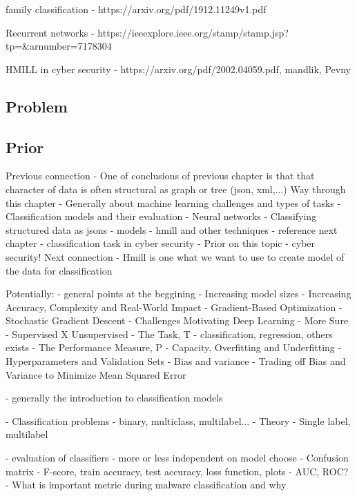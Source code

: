 family classification - https://arxiv.org/pdf/1912.11249v1.pdf

Recurrent networks - https://ieeexplore.ieee.org/stamp/stamp.jsp?tp=&arnumber=7178304

HMILL in cyber security - https://arxiv.org/pdf/2002.04059.pdf, mandlik, Pevny

\subsection{Problem}
\subsection{Prior}






Previous connection
- One of conclusions of previous chapter is that that character of data is often structural as graph or tree (json, xml,...)
Way through this chapter
- Generally about machine learning challenges and types of tasks
- Classification models and their evaluation
- Neural networks
- Classifying structured data as jsons - models
    - hmill and other techniques - reference next chapter
- classification task in cyber security
- Prior on this topic - cyber security!
Next connection
- Hmill is one what we want to use to create model of the data for classification


\cite{GoodBengCour16}
Potentially:
- general points at the beggining
    - Increasing model sizes
    - Increasing Accuracy, Complexity and Real-World Impact
    - Gradient-Based Optimization
    - Stochastic Gradient Descent
    - Challenges Motivating Deep Learning
- More Sure
    - Supervised X Unsupervised
    - The Task, T - classification, regression, others exists
    - The Performance Measure, P
    - Capacity, Overfitting and Underfitting
    - Hyperparameters and Validation Sets
    - Bias and variance - Trading off Bias and Variance to Minimize Mean Squared
    Error

\cite{Bishop2006}
 - generally the introduction to classification models


- Classification problems - binary, multiclass, multilabel...
- Theory
- Single label, multilabel

- evaluation of classifiers - more or less independent on model choose
  - Confusion matrix
  - F-score, train accuracy, test accuracy, loss function, plots
        - AUC, ROC?
  - What is important metric during malware classification and why


